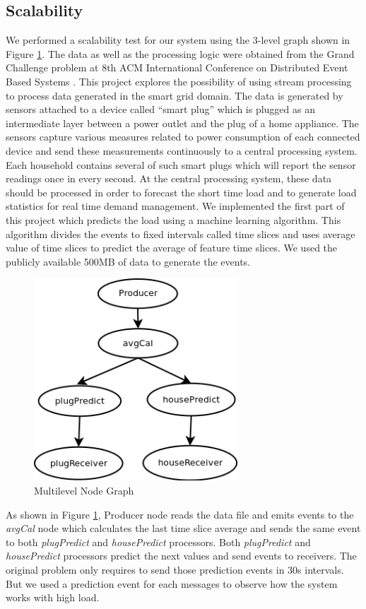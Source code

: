 \subsection{Scalability}
We performed a scalability test for our system using the 3-level graph shown in Figure \ref{multigraph}. The data as well as the processing logic were obtained from the Grand Challenge problem at 8th ACM International Conference on Distributed Event Based Systems \cite{acm}. This project explores the possibility of using stream processing to process data generated in the smart grid domain. The data is generated by sensors attached to a device called “smart plug” which is plugged as an intermediate layer between a power outlet and the plug of a home appliance. The sensors capture various measures related to power consumption of each connected device and send these measurements continuously to a central processing system. Each household contains several of such smart plugs which will report the sensor readings once in every second. At the central processing system, these data should be processed in order to forecast the short time load and to generate load statistics for real time demand management. We implemented the first part of this project which predicts the load using a machine learning algorithm. This algorithm divides the events to fixed intervals called  time slices and uses average value of time slices to predict the average of feature time slices. We used the publicly available 500MB of data to generate the events.

\begin{figure}[!t]
        \centering
        \includegraphics[width=3.0in]{multigraph.png}
        \caption{Multilevel Node Graph}
        \label{multigraph}
\end{figure}

As shown in Figure \ref{multigraph}, Producer node reads the data file and emits events to the \textit{avgCal} node which calculates the last time slice average and sends the same event to both \textit{plugPredict} and \textit{housePredict} processors. Both \textit{plugPredict} and \textit{housePredict} processors predict the next values and send events to receivers. The original problem only requires to send those prediction events in 30s intervals. But we used a prediction event for each messages to observe how the system works with high load. 
 
